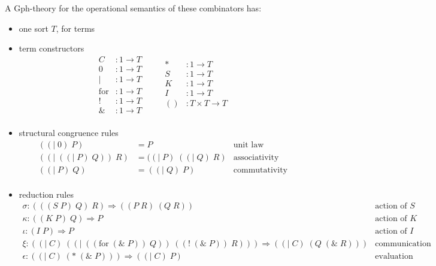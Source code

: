 \documentclass[a4paper,UKenglish]{lipics-v2016}
\newcommand{\for}{\mathrm{for }}
\newcommand{\maps}{\colon}
\begin{document}
A Gph-theory for the operational semantics of these combinators has:
\begin{itemize}
  \item one sort $T$, for terms
  \item term constructors
    \[\begin{array}{rl}
      C &: 1 \to T \\ 
      0 &: 1 \to T \\ 
      | &: 1 \to T \\ 
      \for &: 1 \to T \\ 
      ! &: 1 \to T \\ 
      \& &: 1 \to T \\ 
    \end{array}\quad\quad
    \begin{array}{rl}
      * &: 1 \to T \\ 
      S &: 1 \to T \\ 
      K &: 1 \to T \\ 
      I &: 1 \to T \\ 
      () &: T \times T \to T \\ 
    \end{array}\]
  \item structural congruence rules
    \[\begin{array}{rll}
      ((|\; 0)\; P) &= P & \mbox{unit law}\\
      ((|\; ((|\; P)\; Q))\; R) &= ((|\; P)\; ((|\; Q)\; R) & \mbox{associativity}\\
      ((|\; P)\; Q) &= ((|\; Q)\; P) &\mbox{commutativity}\\
    \end{array}\]
  \item reduction rules
    \[\begin{array}{ll}
      \sigma\maps (((S\; P)\; Q)\; R) \Rightarrow ((P\; R)\; (Q\; R)) & \mbox{action of }S \\ 
      \kappa\maps ((K\; P)\; Q) \Rightarrow P & \mbox{action of }K\\ 
      \iota\maps (I\; P) \Rightarrow P & \mbox{action of }I\\ 
      \xi\maps ((|\; C)\; ((|\; ((\for\; (\&\; P))\; Q))\; ((!\; (\&\; P))\; R))) \Rightarrow ((|\; C)\; (Q\; (\&\; R))) & \mbox{communication}\\
      \epsilon\maps ((|\; C)\;(*\; (\&\; P))) \Rightarrow ((|\; C)\; P) & \mbox{evaluation} \\
    \end{array}\]
\end{itemize}
\end{document}

